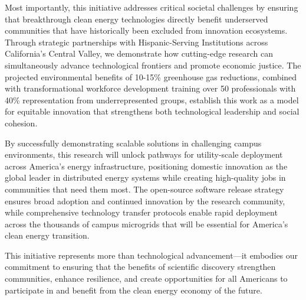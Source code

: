 \documentclass[12pt]{article}
\begin{document}
Most importantly, this initiative addresses critical societal challenges by ensuring that breakthrough clean energy technologies directly benefit underserved communities that have historically been excluded from innovation ecosystems. Through strategic partnerships with Hispanic-Serving Institutions across California's Central Valley, we demonstrate how cutting-edge research can simultaneously advance technological frontiers and promote economic justice. The projected environmental benefits of 10-15\% greenhouse gas reductions, combined with transformational workforce development training over 50 professionals with 40\% representation from underrepresented groups, establish this work as a model for equitable innovation that strengthens both technological leadership and social cohesion.

By successfully demonstrating scalable solutions in challenging campus environments, this research will unlock pathways for utility-scale deployment across America's energy infrastructure, positioning domestic innovation as the global leader in distributed energy systems while creating high-quality jobs in communities that need them most. The open-source software release strategy ensures broad adoption and continued innovation by the research community, while comprehensive technology transfer protocols enable rapid deployment across the thousands of campus microgrids that will be essential for America's clean energy transition.

This initiative represents more than technological advancement---it embodies our commitment to ensuring that the benefits of scientific discovery strengthen communities, enhance resilience, and create opportunities for all Americans to participate in and benefit from the clean energy economy of the future.




\end{document}
